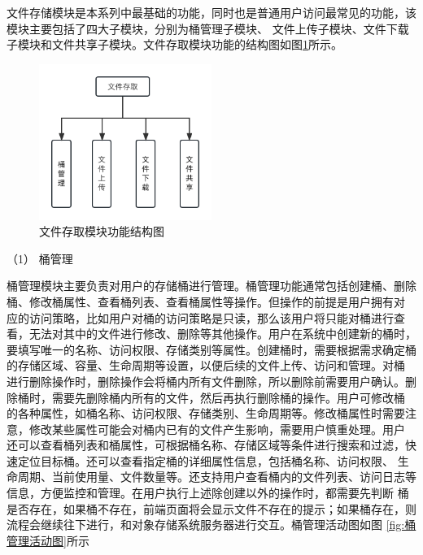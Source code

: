 文件存储模块是本系列中最基础的功能，同时也是普通用户访问最常见的功能，该模块主要包括了四大子模块，分别为桶管理子模块、
文件上传子模块、文件下载子模块和文件共享子模块。文件存取模块功能的结构图如图\ref{fig:文件存取模块功能结构图}所示。

\begin{figure}[htb]
    \centering
    \includegraphics[width=0.5\textwidth]{my_figures/chapter4/文件存取模块功能结构图.png}
    \caption{文件存取模块功能结构图}
    \label{fig:文件存取模块功能结构图}
\end{figure}

（1） 桶管理

桶管理模块主要负责对用户的存储桶进行管理。桶管理功能通常包括创建桶、删除桶、修改桶属性、查看桶列表、查看桶属性等操作。但操作的前提是用户拥有对
应的访问策略，比如用户对桶的访问策略是只读，那么该用户将只能对桶进行查看，无法对其中的文件进行修改、删除等其他操作。用户在系统中创建新的桶时，
要填写唯一的名称、访问权限、存储类别等属性。创建桶时，需要根据需求确定桶的存储区域、容量、生命周期等设置，以便后续的文件上传、访问和管理。对桶
进行删除操作时，删除操作会将桶内所有文件删除，所以删除前需要用户确认。删除桶时，需要先删除桶内所有的文件，然后再执行删除桶的操作。用户可修改桶
的各种属性，如桶名称、访问权限、存储类别、生命周期等。修改桶属性时需要注意，修改某些属性可能会对桶内已有的文件产生影响，需要用户慎重处理。用户
还可以查看桶列表和桶属性，可根据桶名称、存储区域等条件进行搜索和过滤，快速定位目标桶。还可以查看指定桶的详细属性信息，包括桶名称、访问权限、
生命周期、当前使用量、文件数量等。还支持用户查看桶内的文件列表、访问日志等信息，方便监控和管理。在用户执行上述除创建以外的操作时，都需要先判断
桶是否存在，如果桶不存在，前端页面将会显示文件不存在的提示；如果桶存在，则流程会继续往下进行，和对象存储系统服务器进行交互。桶管理活动图如图
\ref{fig:桶管理活动图}所示


